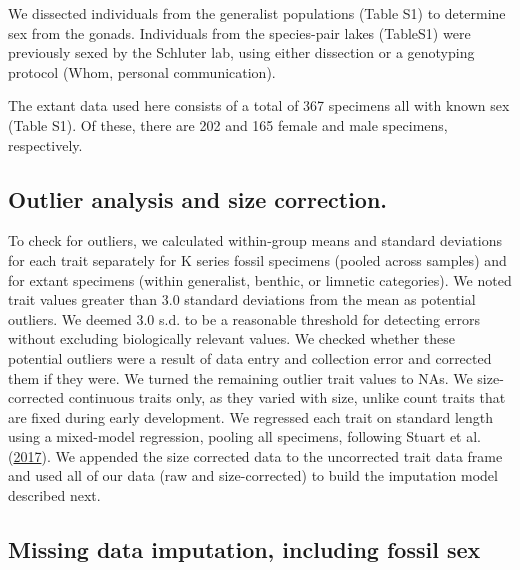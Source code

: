 \documentclass[
  12pt,
]{article}
\begin{document}
We dissected individuals from the generalist populations (Table S1) to
determine sex from the gonads. Individuals from the species-pair lakes
(TableS1) were previously sexed by the Schluter lab, using either
dissection or a genotyping protocol (Whom, personal communication).

The extant data used here consists of a total of 367 specimens all with
known sex (Table S1). Of these, there are 202 and 165 female and male
specimens, respectively.

\hypertarget{outlier-analysis-and-size-correction.}{%
\subsection{Outlier analysis and size
correction.}\label{outlier-analysis-and-size-correction.}}

To check for outliers, we calculated within-group means and standard
deviations for each trait separately for K series fossil specimens
(pooled across samples) and for extant specimens (within generalist,
benthic, or limnetic categories). We noted trait values greater than 3.0
standard deviations from the mean as potential outliers. We deemed 3.0
s.d. to be a reasonable threshold for detecting errors without excluding
biologically relevant values. We checked whether these potential
outliers were a result of data entry and collection error and corrected
them if they were. We turned the remaining outlier trait values to NAs.
We size-corrected continuous traits only, as they varied with size,
unlike count traits that are fixed during early development. We
regressed each trait on standard length using a mixed-model regression,
pooling all specimens, following Stuart et al.
(\protect\hyperlink{ref-Stuartetal2017}{2017}). We appended the size
corrected data to the uncorrected trait data frame and used all of our
data (raw and size-corrected) to build the imputation model described
next.

\hypertarget{missing-data-imputation-including-fossil-sex}{%
\subsection{Missing data imputation, including fossil
sex}\label{missing-data-imputation-including-fossil-sex}}
\end{document}
